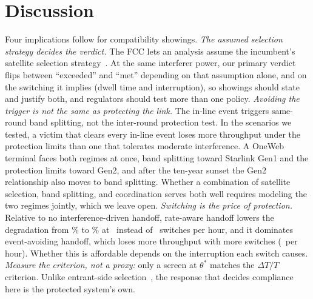 \documentclass[conference]{IEEEtran}
\begin{document}
\section{Discussion}
\label{sec:discussion}
Four implications follow for compatibility showings.
\emph{The assumed selection strategy decides the verdict.} The FCC lets an
analysis assume the incumbent's satellite selection strategy~\cite{fcc24117}. At
the same interferer power, our primary verdict flips between ``exceeded'' and ``met''
depending on that assumption alone, and on the switching it implies (dwell time
and interruption), so showings should state and justify both, and regulators
should test more than one policy. \emph{Avoiding the trigger is not the same as
protecting the link.} The in-line event triggers same-round
band splitting, not the inter-round protection test. In the scenarios we tested,
a victim that clears every in-line event loses more throughput under the
protection limits than one that tolerates moderate interference. A OneWeb
terminal faces both regimes at once, band splitting toward Starlink Gen1 and the
protection limits toward Gen2, and after the ten-year sunset the Gen2 relationship
also moves to band splitting. Whether a combination of
satellite selection, band splitting, and coordination serves both well requires
modeling the two regimes jointly, which we leave open. \emph{Switching is the price of protection.} Relative to no interference-driven
handoff, rate-aware handoff lowers the degradation from \DepGenTwoNoHoDegrPct\% to
\DepGenTwoRateMaxDegrPct\% at \DepDwellRateMaxNTenSwitchesPerHour\ instead of
\IntRateMaxBaseSwitchesPerHour\ switches per hour, and it dominates event-avoiding
handoff, which loses more throughput with more switches
(\DepDwellEvAvNTenSwitchesPerHour\ per hour). Whether this is affordable depends on the
interruption each switch causes. \emph{Measure the criterion, not a proxy:} only a screen at $\theta^{*}$ matches
the $\Delta T/T$ criterion. Unlike entrant-side
selection~\cite{kim2026selection}, the response that decides compliance here is
the protected system's own.
\end{document}
